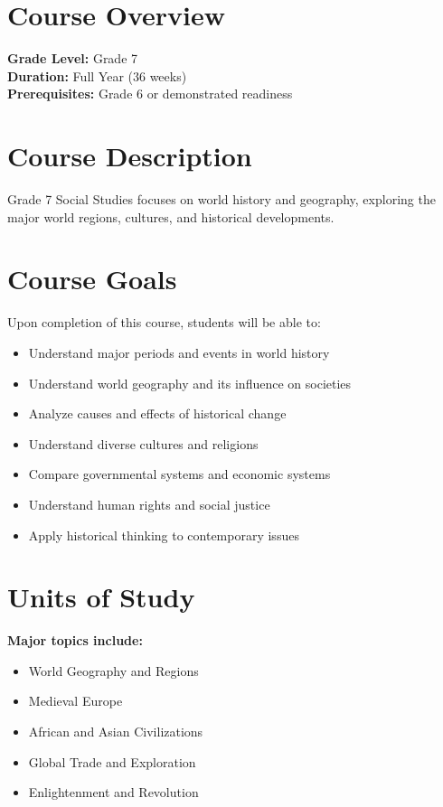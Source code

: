 \documentclass[11pt,letterpaper]{report}
\begin{document}
\section{Course Overview}

\textbf{Grade Level:} Grade 7\\
\textbf{Duration:} Full Year (36 weeks)\\
\textbf{Prerequisites:} Grade 6 or demonstrated readiness

\section{Course Description}

Grade 7 Social Studies focuses on world history and geography, exploring the major world regions, cultures, and historical developments.

\section{Course Goals}

Upon completion of this course, students will be able to:

\begin{itemize}
    \item Understand major periods and events in world history
    \item Understand world geography and its influence on societies
    \item Analyze causes and effects of historical change
    \item Understand diverse cultures and religions
    \item Compare governmental systems and economic systems
    \item Understand human rights and social justice
    \item Apply historical thinking to contemporary issues
\end{itemize}

\section{Units of Study}

\textbf{Major topics include:}
\begin{itemize}
    \item World Geography and Regions
    \item Medieval Europe
    \item African and Asian Civilizations
    \item Global Trade and Exploration
    \item Enlightenment and Revolution
\end{itemize}
\end{document}
